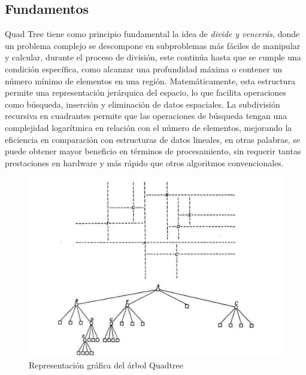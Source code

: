 \documentclass[9pt,a4paper,twoside]{rho-class/rho}
\begin{document}
        \subsection{Fundamentos}
            Quad Tree tiene como principio fundamental la idea de \textit{divide y vencerás}, donde un problema complejo se descompone en subproblemas más fáciles de manipular y calcular, durante el proceso de división, este continúa hasta que se cumple una condición específica, como alcanzar una profundidad máxima o contener un número mínimo de elementos en una región.
            Matemáticamente, esta estructura permite una representación jerárquica del espacio, lo que facilita operaciones como búsqueda, inserción y eliminación de datos espaciales. La subdivisión recursiva en cuadrantes permite que las operaciones de búsqueda tengan una complejidad logarítmica en relación con el número de elementos, mejorando la eficiencia en comparación con estructuras de datos lineales, en otras palabras, se puede obtener mayor beneficio en términos de procesamiento, sin requerir tantas prestaciones en hardware y más rápido que otros algoritmos convencionales. \cite{samet_quadtree}
            \begin{figure}[h]
                \centering
                \includegraphics[width=\linewidth]{figures/quad-tree.pdf}
                \caption{Representación gráfica del árbol Quadtree \cite{finkel_bentley_quadtree}}
                \label{fig:tree_representation_figure}
            \end{figure}\\
\end{document}

